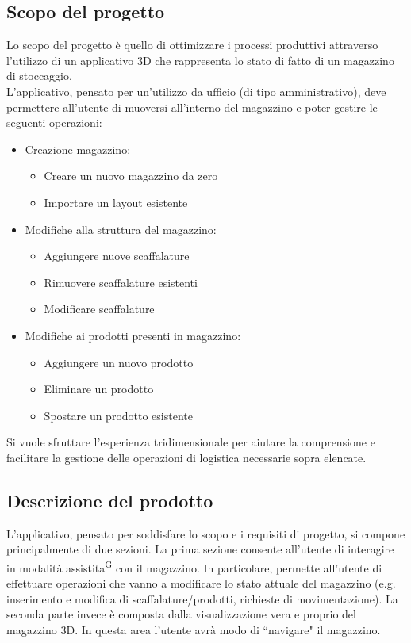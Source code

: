 \subsection{Scopo del progetto}\label{sec:scopo_del_progetto}
Lo scopo del progetto è quello di ottimizzare i processi produttivi attraverso l'utilizzo di 
un applicativo 3D che rappresenta lo stato di fatto di un magazzino di stoccaggio.\\
L'applicativo, pensato per un'utilizzo da ufficio (di tipo amministrativo), deve permettere all'utente di muoversi all'interno 
del magazzino e poter gestire le seguenti operazioni:
\begin{itemize}
    \item Creazione magazzino:
        \begin{itemize}
            \item Creare un nuovo magazzino da zero
            \item Importare un layout esistente
        \end{itemize}
    \item Modifiche alla struttura del magazzino:
        \begin{itemize}            
            \item Aggiungere nuove scaffalature
            \item Rimuovere scaffalature esistenti
            \item Modificare scaffalature
        \end{itemize}
    \item Modifiche ai prodotti presenti in magazzino:
        \begin{itemize}            
            \item Aggiungere un nuovo prodotto
            \item Eliminare un prodotto
            \item Spostare un prodotto esistente
        \end{itemize}
\end{itemize}
Si vuole sfruttare l'esperienza tridimensionale per aiutare la comprensione e facilitare la gestione delle 
operazioni di logistica necessarie sopra elencate. 


\subsection{Descrizione del prodotto}\label{sec:descrizione_del_prodotto}
L'applicativo, pensato per soddisfare lo scopo e i requisiti di progetto, si compone principalmente di due sezioni. 
La prima sezione consente all'utente di interagire in modalità assistita\textsuperscript{G} con il magazzino. In particolare, permette all'utente di effettuare operazioni che vanno a modificare lo stato attuale del magazzino (e.g. inserimento e modifica di scaffalature/prodotti, richieste di movimentazione). 
La seconda parte invece è composta dalla visualizzazione vera e proprio del magazzino 3D. In questa area l'utente avrà modo di ``navigare" il magazzino. 

